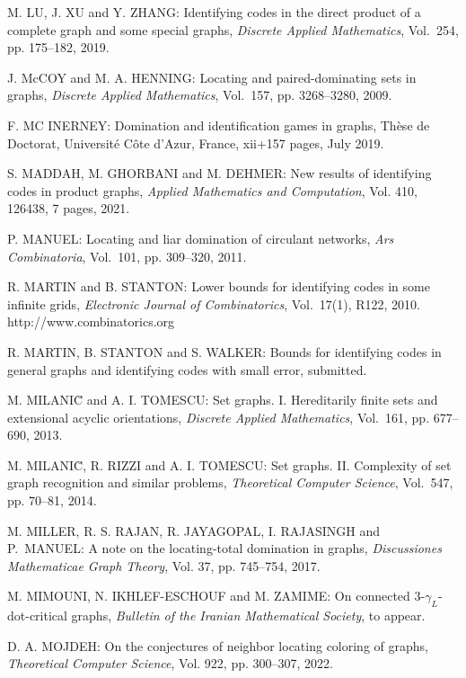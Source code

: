 \begin{thebibliography}{999}
M. LU, J. XU and Y. ZHANG: Identifying codes in the direct product of a complete graph and some special graphs, {\it Discrete Applied Mathematics}, Vol.~254, pp. 175--182, 2019.

J. McCOY and M. A. HENNING: Locating and paired-dominating sets in graphs, {\it Discrete Applied Mathematics}, Vol.~157, pp. 3268--3280, 2009.

F. MC INERNEY: Domination and identification games in graphs, Th\`ese de
Doctorat, Universit\'e C\^ote d'Azur, France, xii+157 pages, July 2019.

S. MADDAH, M. GHORBANI and M. DEHMER: New results of identifying codes in product graphs, {\it Applied Mathematics and Computation}, Vol. 410, 126438, 7 pages, 2021.

P. MANUEL: Locating and liar domination of circulant networks, {\it Ars Combinatoria}, Vol.~101, pp. 309--320, 2011.

R. MARTIN and B. STANTON: Lower bounds for identifying codes in some infinite grids, {\it Electronic Journal of Combinatorics}, Vol.~17(1), R122, 2010.\\
http://www.combinatorics.org

R. MARTIN, B. STANTON and S. WALKER: Bounds for identifying codes in general graphs and  identifying codes with small error, submitted.

M. MILANI\u{C} and A. I. TOMESCU: Set graphs. I. Hereditarily finite sets and extensional acyclic orientations, {\it Discrete Applied Mathematics}, Vol.~161, pp. 677--690, 2013.

M. MILANI\u{C}, R. RIZZI and A. I. TOMESCU: Set graphs. II. Complexity of set graph recognition and similar problems, {\it Theoretical Computer Science}, Vol.~547, pp. 70--81, 2014.

M. MILLER, R. S. RAJAN, R. JAYAGOPAL, I. RAJASINGH and P.~MA\-NUEL: A note on the locating-total domination in graphs, {\it Discussiones Mathematicae Graph Theory}, Vol. 37, pp. 745--754, 2017.

M. MIMOUNI, N. IKHLEF-ESCHOUF and M. ZAMIME: On connected 3-$\gamma_L$-dot-critical graphs, {\it Bulletin of the Iranian Mathematical Society}, to appear.

D. A. MOJDEH: On the conjectures of neighbor locating coloring of graphs, {\it Theoretical Computer Science}, Vol. 922, pp. 300--307, 2022.


\end{thebibliography}
